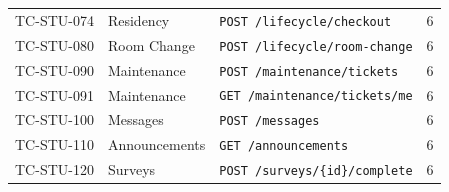 \documentclass[12pt,a4paper]{article}
\begin{document}
\begin{longtable}{L{2.5cm} L{4cm} L{6cm} L{2cm}}
TC-STU-074 & Residency & \texttt{POST /lifecycle/checkout} & 6 \\
TC-STU-080 & Room Change & \texttt{POST /lifecycle/room-change} & 6 \\
TC-STU-090 & Maintenance & \texttt{POST /maintenance/tickets} & 6 \\
TC-STU-091 & Maintenance & \texttt{GET /maintenance/tickets/me} & 6 \\
TC-STU-100 & Messages & \texttt{POST /messages} & 6 \\
TC-STU-110 & Announcements & \texttt{GET /announcements} & 6 \\
TC-STU-120 & Surveys & \texttt{POST /surveys/\{id\}/complete} & 6 \\

\end{longtable}
\end{document}
